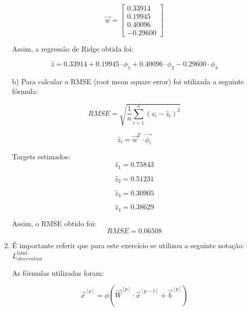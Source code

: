 \documentclass[a4paper,12pt]{article} %
\begin{document}
\begin{enumerate}
\begin{equation*}
    \vec{w} = \begin{bmatrix}  0.33914 \\ 0.19945 \\ 0.40096 \\ -0.29600 \end{bmatrix}
\end{equation*}

Assim, a regressão de Ridge obtida foi:

\begin{equation*}  
    \hat{z} = 0.33914 + 0.19945 \cdot \phi_1 + 0.40096 \cdot \phi_2 - 0.29600 \cdot \phi_3
\end{equation*}

b)
Para calcular o RMSE (root mean square error) foi utilizada a seguinte fórmula:

\begin{equation}
    RMSE = \sqrt{\frac{1}{n} \sum_{i=1}^{n} (z_i - \hat{z}_i)^2}
\end{equation}

\begin{equation}
    \hat{z}_i = \vec{w}^T \cdot \vec{\phi_i}
\end{equation}
 
Targets estimados:
\begin{equation*}
    \hat{z}_1 = 0.75843
\end{equation*}

\begin{equation*}
    \hat{z}_2 = 0.51231
\end{equation*}

\begin{equation*}
    \hat{z}_3 = 0.30905
\end{equation*}

\begin{equation*}
    \hat{z}_4 = 0.38629
\end{equation*}

Assim, o RMSE obtido foi:
\begin{equation*}
    RMSE = 0.06508
\end{equation*}

\item
É importante referir que para este exercício se utilizou a seguinte notação: $L^{\text{label}}_{observation}$

As fórmulas utilizadas foram:

\begin{equation*}
    \vec{x}^{[p]} = \phi(\vec{W}^{[p]} \cdot \vec{x}^{[p-1]} + \vec{b}^{[p]})
\end{equation*}


\end{enumerate}
\end{document}
